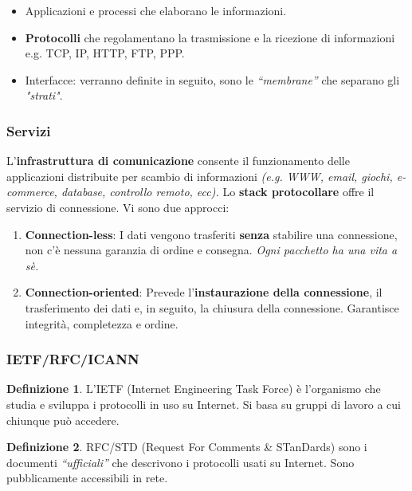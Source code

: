 \documentclass[11pt,a4paper]{article}
\theoremstyle{definition}
\newtheorem{definition}{Definizione}[section]
\begin{document}
\begin{itemize}
	\item Applicazioni e processi che elaborano le informazioni.
	\item \textbf{Protocolli} che regolamentano la trasmissione e la ricezione di informazioni e.g. TCP, IP, HTTP, FTP, PPP.
	\item Interfacce: verranno definite in seguito, sono le \textit{“membrane”} che separano gli \textit{"strati"}.
\end{itemize}

\subsubsection{Servizi}
L’\textbf{infrastruttura di comunicazione} consente il funzionamento delle applicazioni distribuite per scambio di informazioni \textit{(e.g. WWW, email, giochi, e-commerce, database, controllo remoto, ecc).}\newline
Lo \textbf{stack protocollare} offre il servizio di connessione. Vi sono due approcci:
\begin{enumerate}
	\item \textbf{Connection-less}: I dati vengono trasferiti \textbf{senza} stabilire una
	      connessione, non c'è nessuna garanzia di ordine e consegna. \textit{Ogni pacchetto ha una vita a sè.}
	\item \textbf{Connection-oriented}: Prevede l'\textbf{instaurazione della connessione}, il trasferimento dei dati e, in seguito, la chiusura della connessione. Garantisce integrità, completezza e ordine.
\end{enumerate}

\subsubsection{IETF/RFC/ICANN}

\theoremstyle{definition}
\begin{definition}
	L'IETF (Internet Engineering Task Force) è l’organismo che studia e sviluppa i protocolli in uso su Internet. Si basa su gruppi di lavoro a cui chiunque può accedere.
\end{definition}

\theoremstyle{definition}
\begin{definition}
	RFC/STD (Request For Comments \& STanDards) sono i documenti \textit{“ufficiali” } che descrivono i protocolli usati su Internet. Sono pubblicamente accessibili in rete.
\end{definition}
\end{document}
